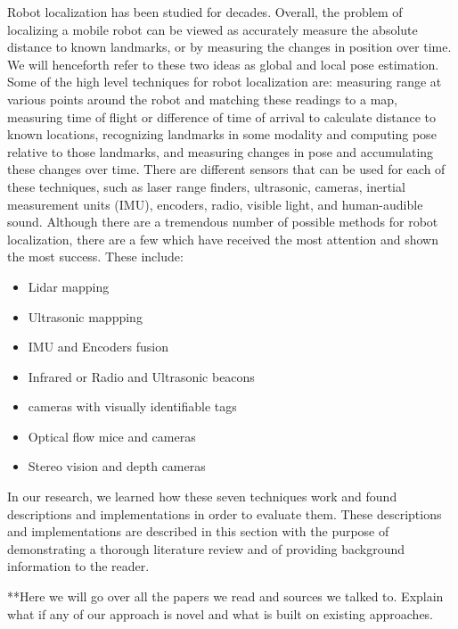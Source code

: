 \documentclass{article}
\begin{document}
Robot localization has been studied for decades. Overall, the problem of localizing a mobile robot can be viewed as accurately measure the absolute distance to known landmarks, or by measuring the changes in position over time. We will henceforth refer to these two ideas as global and local pose estimation. Some of the high level techniques for robot localization are: measuring range at various points around the robot and matching these readings to a map, measuring time of flight or difference of time of arrival to calculate distance to known locations, recognizing landmarks in some modality and computing pose relative to those landmarks, and measuring changes in pose and accumulating these changes over time. There are different sensors that can be used for each of these techniques, such as laser range finders, ultrasonic, cameras, inertial measurement units (IMU), encoders, radio, visible light, and human-audible sound. Although there are a tremendous number of possible methods for robot localization, there are a few which have received the most attention and shown the most success. These include:
\begin{itemize}
    \item Lidar mapping
    \item Ultrasonic mappping
    \item IMU and Encoders fusion
    \item Infrared or Radio and Ultrasonic beacons
    \item cameras with visually identifiable tags
    \item Optical flow mice and cameras
    \item Stereo vision and depth cameras
\end{itemize}

In our research, we learned how these seven techniques work and found descriptions and implementations in order to evaluate them. These descriptions and implementations are described in this section with the purpose of demonstrating a thorough literature review and of providing background information to the reader.

**Here we will go over all the papers we read and sources we talked to. Explain what if any of our approach is novel and what is built on existing approaches.
\end{document}
